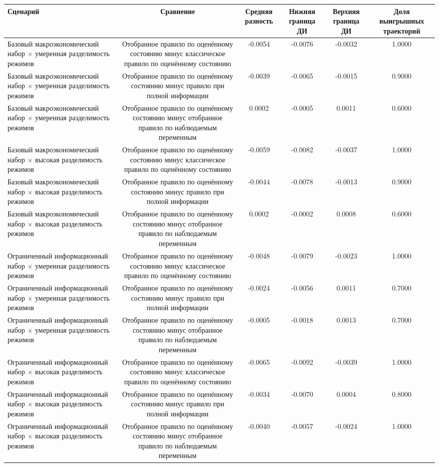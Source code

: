 \begin{tabular}{lccccc}
\toprule
Сценарий & Сравнение & Средняя разность & Нижняя граница ДИ & Верхняя граница ДИ & Доля выигрышных траекторий \\
\midrule
Базовый макроэкономический набор × умеренная разделимость режимов & Отобранное правило по оценённому состоянию минус классическое правило по оценённому состоянию & -0.0054 & -0.0076 & -0.0032 & 1.0000 \\
Базовый макроэкономический набор × умеренная разделимость режимов & Отобранное правило по оценённому состоянию минус правило при полной информации & -0.0039 & -0.0065 & -0.0015 & 0.9000 \\
Базовый макроэкономический набор × умеренная разделимость режимов & Отобранное правило по оценённому состоянию минус отобранное правило по наблюдаемым переменным & 0.0002 & -0.0005 & 0.0011 & 0.6000 \\
Базовый макроэкономический набор × высокая разделимость режимов & Отобранное правило по оценённому состоянию минус классическое правило по оценённому состоянию & -0.0059 & -0.0082 & -0.0037 & 1.0000 \\
Базовый макроэкономический набор × высокая разделимость режимов & Отобранное правило по оценённому состоянию минус правило при полной информации & -0.0044 & -0.0078 & -0.0013 & 0.9000 \\
Базовый макроэкономический набор × высокая разделимость режимов & Отобранное правило по оценённому состоянию минус отобранное правило по наблюдаемым переменным & 0.0002 & -0.0002 & 0.0008 & 0.6000 \\
Ограниченный информационный набор × умеренная разделимость режимов & Отобранное правило по оценённому состоянию минус классическое правило по оценённому состоянию & -0.0048 & -0.0079 & -0.0023 & 1.0000 \\
Ограниченный информационный набор × умеренная разделимость режимов & Отобранное правило по оценённому состоянию минус правило при полной информации & -0.0024 & -0.0056 & 0.0011 & 0.7000 \\
Ограниченный информационный набор × умеренная разделимость режимов & Отобранное правило по оценённому состоянию минус отобранное правило по наблюдаемым переменным & -0.0005 & -0.0018 & 0.0013 & 0.7000 \\
Ограниченный информационный набор × высокая разделимость режимов & Отобранное правило по оценённому состоянию минус классическое правило по оценённому состоянию & -0.0065 & -0.0092 & -0.0039 & 1.0000 \\
Ограниченный информационный набор × высокая разделимость режимов & Отобранное правило по оценённому состоянию минус правило при полной информации & -0.0034 & -0.0070 & 0.0004 & 0.8000 \\
Ограниченный информационный набор × высокая разделимость режимов & Отобранное правило по оценённому состоянию минус отобранное правило по наблюдаемым переменным & -0.0040 & -0.0057 & -0.0024 & 1.0000 \\
\bottomrule
\end{tabular}